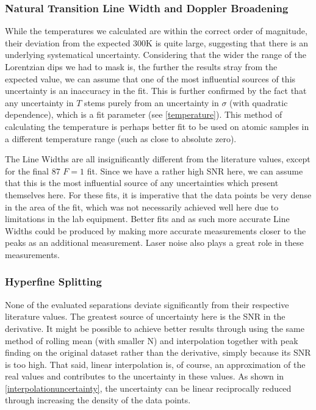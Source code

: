 \documentclass[12pt, a4paper]{article}
\begin{document}
\subsubsection{Natural Transition Line Width and Doppler Broadening}
While the temperatures we calculated are within the correct order of magnitude, their deviation from the expected $300\si{\kelvin}$ is quite large, suggesting that there is an underlying systematical uncertainty. Considering that the wider the range of the Lorentzian dips we had to mask is, the further the results stray from the expected value, we can assume that one of the most influential sources of this uncertainty is an inaccuracy in the fit. This is further confirmed by the fact that any uncertainty in $T$ stems purely from an uncertainty in $\sigma$ (with quadratic dependence), which is a fit parameter (see \autoref{temperature}). This method of calculating the temperature is perhaps better fit to be used on atomic samples in a different temperature range (such as close to absolute zero).

The Line Widths are all insignificantly different from the literature values, except for the final 87 $F = 1$ fit. Since we have a rather high SNR here, we can assume that this is the most influential source of any uncertainties which present themselves here. For these fits, it is imperative that the data points be very dense in the area of the fit, which was not necessarily achieved well here due to limitations in the lab equipment. Better fits and as such more accurate Line Widths could be produced by making more accurate measurements closer to the peaks as an additional measurement. Laser noise also plays a great role in these measurements.

\subsubsection{Hyperfine Splitting}
None of the evaluated separations deviate significantly from their respective literature values. The greatest source of uncertainty here is the SNR in the derivative. It might be possible to achieve better results through using the same method of rolling mean (with smaller N) and interpolation together with peak finding on the original dataset rather than the derivative, simply because its SNR is too high. That said, linear interpolation is, of course, an approximation of the real values and contributes to the uncertainty in these values. As shown in \autoref{interpolationuncertainty}, the uncertainty can be linear reciprocally reduced through increasing the density of the data points.
\end{document}
